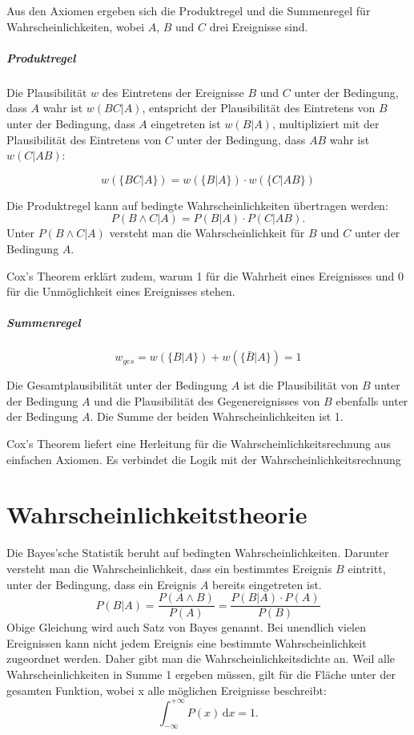 \documentclass[]{dsadokumentation}
\begin{document}
Aus den Axiomen ergeben sich die Produktregel und die Summenregel für Wahrscheinlichkeiten, wobei $A$, $B$ und $C$ drei Ereignisse sind.

\subparagraph{Produktregel}

Die Plausibilität $w$ des Eintretens der Ereignisse $B$ und $C$ unter der Bedingung, dass $A$ wahr ist $w(BC|A)$,
entspricht der Plausibilität des Eintretens von $B$ unter der Bedingung, dass $A$ eingetreten ist $w(B|A)$,
multipliziert mit der Plausibilität des Eintretens von $C$ unter der Bedingung, dass $AB$ wahr ist $w(C|AB)$:

\begin {equation}
w(\{BC|A\})=w(\{B|A\})\cdot w(\{C|AB\})
\end{equation}

\noindent Die Produktregel kann auf bedingte Wahrscheinlichkeiten übertragen werden:
\begin {equation}
P(B \wedge C|A) = P(B|A)\cdot P(C|AB).
\end{equation}
Unter $P(B \wedge C|A)$ versteht man die Wahrscheinlichkeit für $B$ und $C$ unter der Bedingung $A$.

Cox's Theorem erklärt zudem, warum 1 für die Wahrheit eines Ereignisses und 0 für die Unmöglichkeit eines Ereignisses stehen.

\subparagraph{Summenregel}
\begin{equation}
  w_{ges}=w(\{B|A\}) + w(\{\bar{B}|A\})= 1
\end{equation}

Die Gesamtplausibilität unter der Bedingung $A$ ist die Plausibilität von $B$ unter der Bedingung $A$
und die Plausibilität des Gegenereignisses von $B$ ebenfalls unter der Bedingung $A$. Die Summe der beiden Wahrscheinlichkeiten ist 1.


Cox's Theorem liefert eine Herleitung für die Wahrscheinlichkeitsrechnung aus einfachen Axiomen. Es verbindet die Logik mit der Wahrscheinlichkeitsrechnung

\section{Wahrscheinlichkeitstheorie}

Die Bayes'sche Statistik beruht auf bedingten Wahrscheinlichkeiten. Darunter versteht man die Wahrscheinlichkeit, dass ein bestimmtes Ereignis $B$ eintritt, unter der Bedingung, dass ein Ereignis $A$ bereits eingetreten ist.
\begin{equation}
  P(B|A) = \frac{P(A \wedge B)}{P(A)} = \frac{P(B|A)\cdot P(A)}{P(B)}
\end{equation}
Obige Gleichung wird auch Satz von Bayes genannt. Bei unendlich vielen Ereignissen kann nicht jedem Ereignis eine bestimmte Wahrscheinlichkeit zugeordnet werden. Daher gibt man die Wahrscheinlichkeitsdichte an. Weil alle Wahrscheinlichkeiten in Summe 1 ergeben müssen, gilt für die Fläche unter der gesamten Funktion, wobei x alle möglichen Ereignisse beschreibt:
\begin{equation}
  \int_{- \infty }^ {+ \infty} P(x) \,\mbox{d}x = 1.
\end{equation}
\end{document}

